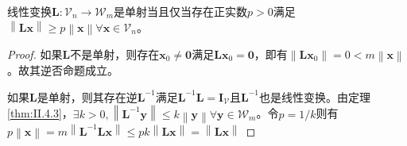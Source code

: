 \documentclass[main.tex]{subfiles}
\begin{document}
\begin{lemma}\label{thm:inv_func_l1}
    线性变换$\mathbf{L}:\mathcal{V}_n\rightarrow\mathcal{W}_m$是单射当且仅当存在正实数$p>0$满足$\left\|\mathbf{Lx}\right\|\geq p \left\|\mathbf{x}\right\|\forall\mathbf{x}\in\mathcal{V}_n$。
\end{lemma}
\begin{proof}
    如果$\mathbf{L}$不是单射，则存在$\mathbf{x}_0\neq\mathbf{0}$满足$\mathbf{Lx}_0=\mathbf{0}$，即有$\left\|\mathbf{Lx}_0\right\|=0<m\left\|\mathbf{x}\right\|$。故其逆否命题成立。

    如果$\mathbf{L}$是单射，则其存在逆$\mathbf{L}^{-1}$满足$\mathbf{L}^{-1}\mathbf{L}=\mathbf{I}_\mathcal{V}$且$\mathbf{L}^{-1}$也是线性变换。由定理\ref{thm:II.4.3}，$\exists k>0, \left\|\mathbf{L}^{-1}\mathbf{y}\right\|\leq k\left\|\mathbf{y}\right\|\forall\mathbf{y}\in\mathcal{W}_m$。令$p=1/k$则有$p\left\|\mathbf{x}\right\|=m\left\|\mathbf{L}^{-1}\mathbf{Lx}\right\|\leq pk\left\|\mathbf{Lx}\right\|=\left\|\mathbf{Lx}\right\|$
\end{proof}
\end{document}
